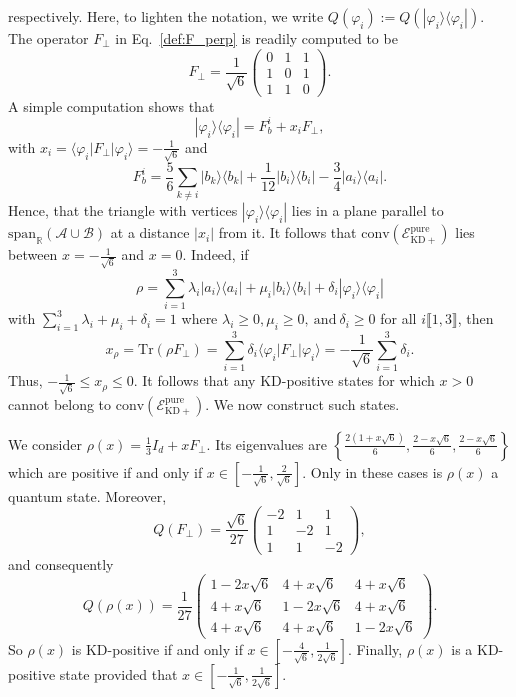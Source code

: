 \documentclass[a4paper, notitlepage, 11pt]{article}
\numberwithin{equation}{section}
\newcommand{\bra}[1]{\langle #1|}
\newcommand{\cket}[1]{|#1\rangle}
\newcommand{\Acal}{{\mathcal A}}
\newcommand{\Bcal}{{\mathcal B}}
\newcommand{\EcalKDCpu}{{\mathcal E}_{\mathrm{KD+}}^{\mathrm{pure}}}
\newcommand{\spanRAB}{{\mathrm{span}_{\R}(\Acal\cup\Bcal)}}
\newcommand{\R}{\mathbb{R}}
\newcommand{\conv}[1]{\mathrm{conv}\left(#1\right)}
\newcommand{\IntEnt}[2]{\llbracket #1 , #2 \rrbracket}
\begin{document}
respectively. Here, to lighten the notation, we write $Q(\varphi_i):=Q(|\varphi_i\rangle\langle \varphi_i|)$.
The operator $F_\perp$ in Eq.~\eqref{def:F_perp} is readily computed to be 
$$
F_\perp=\frac1{\sqrt6}
\begin{pmatrix}
0&1&1\\
1&0&1\\
1&1&0
\end{pmatrix}.
$$
A simple computation shows that 
$$
|\varphi_i\rangle\langle \varphi_i|=F_{b}^{i} +x_iF_\perp,
$$
with $x_i=\langle \varphi_i| F_\perp |\varphi_i\rangle=-\frac{1}{\sqrt{6}}$ and  
\[
F_{b}^{i}= \frac{5}{6}\sum_{k\neq i} \cket{b_k}\bra{b_k} + \frac{1}{12}\cket{b_i}\bra{b_i} -\frac{3}{4}\cket{a_i}\bra{a_i}.
\]
Hence, that the triangle  with vertices $|\varphi_i\rangle\langle \varphi_i|$ lies in a  plane parallel to $\spanRAB$ at a distance $|x_i|$ from it.  It follows that $\conv{\EcalKDCpu}$ lies between $x=-\frac{1}{\sqrt6}$ and $x=0$. Indeed, if 
\[
\rho = \sum_{i=1}^{3} \lambda_{i}\cket{a_i}\bra{a_i} + \mu_{i}\cket{b_i}\bra{b_i} + \delta_{i}\cket{\varphi_i}\bra{\varphi_i}
\]
with  $\sum_{i=1}^{3} \lambda_{i}+ \mu_{i}+ \delta_{i}=1$ where $\lambda_{i}\geqslant 0, \mu_{i}\geqslant 0, \ \mathrm{ and } \ \delta_{i}\geqslant 0$ for all $i\IntEnt{1}{3}$, then 
\[
x_{\rho} = \mathrm{Tr}(\rho F_\perp) = \sum_{i=1}^{3} \delta_{i}\bra{\varphi_i}F_\perp\cket{\varphi_i} = -\frac{1}{\sqrt{6}}\sum_{i=1}^{3} \delta_{i} .
\]
Thus,  $-\frac{1}{\sqrt{6}}\leqslant x_{\rho} \leqslant 0$. It follows that any  KD-positive  states for which $x>0$ cannot belong to $\conv{\EcalKDCpu}$.
We now construct such states. 

We consider $\rho({x})=\frac{1}{3}I_{d} + xF_\perp$. Its  eigenvalues are $\left\{\frac{2(1+x\sqrt{6})}{6},\frac{2-x\sqrt{6}}{6}, \frac{2-x\sqrt{6}}{6} \right\}$ which are positive if and only if $x\in[-\frac{1}{\sqrt{6}},\frac{2}{\sqrt{6}}]$. Only in these cases is $\rho(x)$ a quantum state. 
Moreover,
\[
Q(F_\perp) =\frac{\sqrt{6}}{27} \begin{pmatrix}
-2 & 1 & 1 \\
1 & -2 & 1 \\
1 & 1 & -2
\end{pmatrix} ,
\]
and consequently 
\[
Q(\rho(x)) = \frac{1}{27}
\begin{pmatrix}
1-2x\sqrt{6} & 4+x\sqrt{6} & 4+x\sqrt{6} \\
4+x\sqrt{6} & 1-2x\sqrt{6}& 4+x\sqrt{6}\\
4+x\sqrt{6} & 4+x\sqrt{6} & 1-2x\sqrt{6}
\end{pmatrix}.
\]
So $\rho(x)$ is KD-positive if and only if $x\in [-\frac{4}{\sqrt{6}},\frac{1}{2\sqrt{6}}]$. Finally, $\rho(x)$ is a KD-positive  state provided that $x\in[-\frac{1}{\sqrt{6}},\frac{1}{2\sqrt{6}}]$. 
\end{document}
